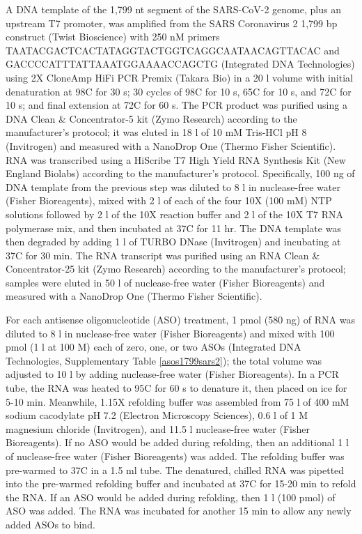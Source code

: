 \documentclass[main.tex]{subfiles}
\begin{document}
A DNA template of the 1,799 nt segment of the SARS-CoV-2 genome, plus an upstream T7 promoter, was amplified from the SARS Coronavirus 2 1,799 bp construct (Twist Bioscience) with 250 nM primers TAATACGACTCACTATAGGTACTGGTCAGGCAATAACAGTTACAC and GACCCCATTTATTAAATGGAAAACCAGCTG (Integrated DNA Technologies) using 2X CloneAmp HiFi PCR Premix (Takara Bio) in a 20 \textmu l volume with initial denaturation at 98\textdegree C for 30 s; 30 cycles of 98\textdegree C for 10 s, 65\textdegree C for 10 s, and 72\textdegree C for 10 s; and final extension at 72\textdegree C for 60 s.
The PCR product was purified using a DNA Clean \& Concentrator-5 kit (Zymo Research) according to the manufacturer's protocol; it was eluted in 18 \textmu l of 10 mM Tris-HCl pH 8 (Invitrogen) and measured with a NanoDrop One (Thermo Fisher Scientific).
RNA was transcribed using a HiScribe T7 High Yield RNA Synthesis Kit (New England Biolabs) according to the manufacturer's protocol.
Specifically, 100 ng of DNA template from the previous step was diluted to 8 \textmu l in nuclease-free water (Fisher Bioreagents), mixed with 2 \textmu l of each of the four 10X (100 mM) NTP solutions followed by 2 \textmu l of the 10X reaction buffer and 2 \textmu l of the 10X T7 RNA polymerase mix, and then incubated at 37\textdegree C for 11 hr.
The DNA template was then degraded by adding 1 \textmu l of TURBO DNase (Invitrogen) and incubating at 37\textdegree C for 30 min.
The RNA transcript was purified using an RNA Clean \& Concentrator-25 kit (Zymo Research) according to the manufacturer's protocol; samples were eluted in 50 \textmu l of nuclease-free water (Fisher Bioreagents) and measured with a NanoDrop One (Thermo Fisher Scientific).

For each antisense oligonucleotide (ASO) treatment, 1 pmol (580 ng) of RNA was diluted to 8 \textmu l in nuclease-free water (Fisher Bioreagents) and mixed with 100 pmol (1 \textmu l at 100 \textmu M) each of zero, one, or two ASOs (Integrated DNA Technologies, Supplementary Table \ref{asos1799sars2}); the total volume was adjusted to 10 \textmu l by adding nuclease-free water (Fisher Bioreagents).
In a PCR tube, the RNA was heated to 95\textdegree C for 60 s to denature it, then placed on ice for 5-10 min.
Meanwhile, 1.15X refolding buffer was assembled from 75 \textmu l of 400 mM sodium cacodylate pH 7.2 (Electron Microscopy Sciences), 0.6 \textmu l of 1 M magnesium chloride (Invitrogen), and 11.5 \textmu l nuclease-free water (Fisher Bioreagents).
If no ASO would be added during refolding, then an additional 1 \textmu l of nuclease-free water (Fisher Bioreagents) was added.
The refolding buffer was pre-warmed to 37\textdegree C in a 1.5 ml tube.
The denatured, chilled RNA was pipetted into the pre-warmed refolding buffer and incubated at 37\textdegree C for 15-20 min to refold the RNA.
If an ASO would be added during refolding, then 1 \textmu l (100 pmol) of ASO was added.
The RNA was incubated for another 15 min to allow any newly added ASOs to bind.
\end{document}
